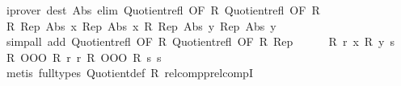 \begin{isabellebody}
\ {\isacharparenleft}{\kern0pt}iprover\ dest{\isacharcolon}{\kern0pt}\ Abs{}\ elim{\isacharcolon}{\kern0pt}\ Quotient{}{\isacharunderscore}{\kern0pt}refl{}\ {\isacharbrackleft}{\kern0pt}OF\ R{}{\isacharbrackright}{\kern0pt}\ Quotient{}{\isacharunderscore}{\kern0pt}refl{}\ {\isacharbrackleft}{\kern0pt}OF\ R{}{\isacharbrackright}{\kern0pt}{\isacharparenright}{\kern0pt}\isanewline
\ \ \ \ \isamarkupfalse%
\ \isamarkupfalse%
\ {\isachardoublequoteopen}R{}{\isacharprime}{\kern0pt}\ {\isacharparenleft}{\kern0pt}Rep{}\ {\isacharparenleft}{\kern0pt}Abs{}\ x{\isacharparenright}{\kern0pt}{\isacharparenright}{\kern0pt}\ {\isacharparenleft}{\kern0pt}Rep{}\ {\isacharparenleft}{\kern0pt}Abs{}\ x{\isacharparenright}{\kern0pt}{\isacharparenright}{\kern0pt}{\isachardoublequoteclose}\ {\isachardoublequoteopen}R{}{\isacharprime}{\kern0pt}\ {\isacharparenleft}{\kern0pt}Rep{}\ {\isacharparenleft}{\kern0pt}Abs{}\ y{\isacharparenright}{\kern0pt}{\isacharparenright}{\kern0pt}\ {\isacharparenleft}{\kern0pt}Rep{}\ {\isacharparenleft}{\kern0pt}Abs{}\ y{\isacharparenright}{\kern0pt}{\isacharparenright}{\kern0pt}{\isachardoublequoteclose}\isanewline
\ \ \ \ \ \ \isamarkupfalse%
\ {\isacharparenleft}{\kern0pt}simp{\isacharunderscore}{\kern0pt}all\ add{\isacharcolon}{\kern0pt}\ Quotient{}{\isacharunderscore}{\kern0pt}refl{}\ {\isacharbrackleft}{\kern0pt}OF\ R{}{\isacharbrackright}{\kern0pt}\ Quotient{}{\isacharunderscore}{\kern0pt}refl{}\ {\isacharbrackleft}{\kern0pt}OF\ R{}{\isacharbrackright}{\kern0pt}\ Rep{}{\isacharparenright}{\kern0pt}\isanewline
\ \ \ \ \isamarkupfalse%
\ {\isacartoucheopen}R{}\ r\ x{\isacartoucheclose}\ {\isacartoucheopen}R{}\ y\ s{\isacartoucheclose}\ \isamarkupfalse%
\ {\isachardoublequoteopen}{\isacharparenleft}{\kern0pt}R{}\ OOO\ R{}{\isacharprime}{\kern0pt}{\isacharparenright}{\kern0pt}\ r\ r{\isachardoublequoteclose}\ {\isachardoublequoteopen}{\isacharparenleft}{\kern0pt}R{}\ OOO\ R{}{\isacharprime}{\kern0pt}{\isacharparenright}{\kern0pt}\ s\ s{\isachardoublequoteclose}\isanewline
\ \ \ \ \ \ \isamarkupfalse%
\ {\isacharparenleft}{\kern0pt}metis\ {\isacharparenleft}{\kern0pt}full{\isacharunderscore}{\kern0pt}types{\isacharparenright}{\kern0pt}\ Quotient{}{\isacharunderscore}{\kern0pt}def\ R{}\ relcompp{\isachardot}{\kern0pt}relcompI{\isacharparenright}{\kern0pt}{\isacharplus}{\kern0pt}\isanewline

\end{isabellebody}

